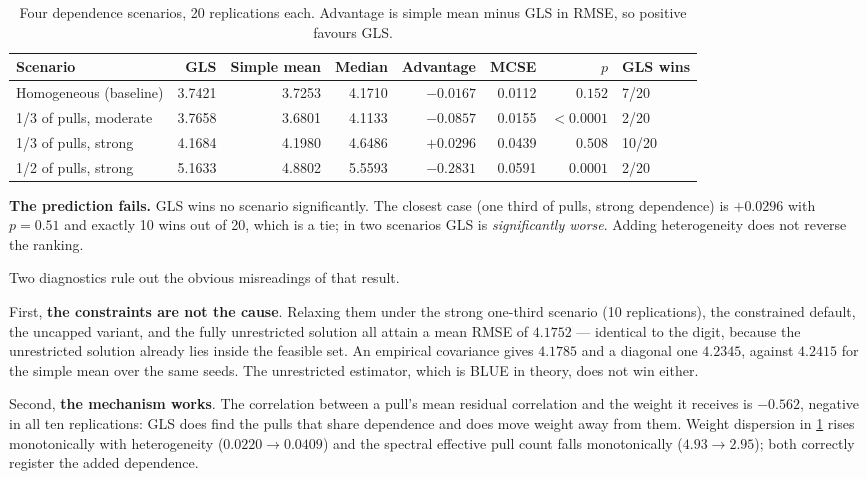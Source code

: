 \documentclass[12pt,a4paper,oneside]{article}
\begin{document}
\begin{table}[H]
\centering
\small
\caption{Four dependence scenarios, 20 replications each. Advantage is simple
mean minus GLS in RMSE, so positive favours GLS.}
\label{tab:depexp}
\begin{tabular}{lrrrrrrl}
\toprule
Scenario & GLS & Simple mean & Median & Advantage & MCSE & $p$ & GLS wins\\
\midrule
Homogeneous (baseline) & 3.7421 & 3.7253 & 4.1710 & $-0.0167$ & 0.0112 & $0.152$ & 7/20\\
1/3 of pulls, moderate & 3.7658 & 3.6801 & 4.1133 & $-0.0857$ & 0.0155 & $<0.0001$ & 2/20\\
1/3 of pulls, strong & 4.1684 & 4.1980 & 4.6486 & $+0.0296$ & 0.0439 & $0.508$ & 10/20\\
1/2 of pulls, strong & 5.1633 & 4.8802 & 5.5593 & $-0.2831$ & 0.0591 & $0.0001$ & 2/20\\
\bottomrule
\end{tabular}
\end{table}

\textbf{The prediction fails.} GLS wins no scenario significantly. The closest
case (one third of pulls, strong dependence) is $+0.0296$ with $p=0.51$ and
exactly 10 wins out of 20, which is a tie; in two scenarios GLS is
\emph{significantly worse}. Adding heterogeneity does not reverse the ranking.

Two diagnostics rule out the obvious misreadings of that result.

First, \textbf{the constraints are not the cause}. Relaxing them under the
strong one-third scenario (10 replications), the constrained default, the
uncapped variant, and the fully unrestricted solution all attain a mean RMSE of
$4.1752$ --- identical to the digit, because the unrestricted solution already
lies inside the feasible set. An empirical covariance gives $4.1785$ and a
diagonal one $4.2345$, against $4.2415$ for the simple mean over the same seeds.
The unrestricted estimator, which is BLUE in theory, does not win either.

Second, \textbf{the mechanism works}. The correlation between a pull's mean
residual correlation and the weight it receives is $-0.562$, negative in all ten
replications: GLS does find the pulls that share dependence and does move weight
away from them. Weight dispersion in \cref{tab:depexp} rises monotonically with
heterogeneity ($0.0220\to0.0409$) and the spectral effective pull count falls
monotonically ($4.93\to2.95$); both correctly register the added dependence.
\end{document}
